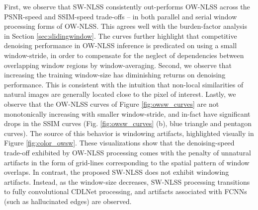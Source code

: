 \documentclass[lettersize,journal]{IEEEtran}
\begin{document}
First, we observe that SW-NLSS consistently
out-performs OW-NLSS across the PSNR-speed and SSIM-speed trade-offs -- in both
parallel and serial window processing forms of OW-NLSS. This agrees well with the burden-factor analysis in Section \ref{sec:slidingwindow}. The curves further highlight that competitive denoising performance in OW-NLSS inference is predicated on using a small window-stride, in order to compensate for the neglect of dependencies between overlapping window regions by window-averaging.
Second, we observe that increasing the training window-size  has
diminishing returns on denoising performance. This is consistent with the
intuition that non-local similarities of natural images are generally located
close to the pixel of interest. 
Lastly, we observe that the OW-NLSS curves of Figure \ref{fig:owsw_curves} are
not monotonically increasing with smaller window-stride, and in-fact have
significant drops in the SSIM curves (Fig. \ref{fig:owsw_curves} (b), blue triangle and pentagon curves). The
source of this behavior is windowing artifacts, highlighted visually in Figure
\ref{fig:color_owsw}. These visualizations show that the denoising-speed
trade-off exhibited by OW-NLSS processing comes with the penalty of unnatural
artifacts in the form of grid-lines corresponding to the spatial pattern of
window overlaps. 
In contrast, the proposed SW-NLSS does not exhibit windowing artifacts. Instead, as the window-size decreases, SW-NLSS processing transitions to fully convolutional CDLNet processing, and 
artifacts associated with FCNNs (such as hallucinated edges) are observed.
\end{document}
